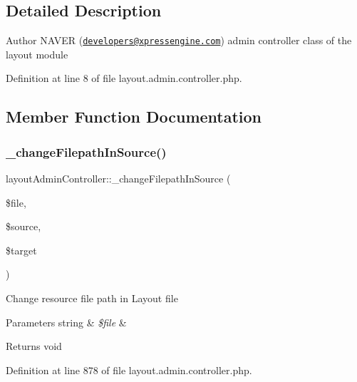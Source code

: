 \subsection{Detailed Description}
\begin{DoxyAuthor}{Author}
N\+A\+V\+ER (\href{mailto:developers@xpressengine.com}{\tt developers@xpressengine.\+com}) admin controller class of the layout module 
\end{DoxyAuthor}


Definition at line 8 of file layout.\+admin.\+controller.\+php.



\subsection{Member Function Documentation}
\hypertarget{classlayoutAdminController_a9dd8cb93d56db698fd6426a11dad6056}{}\label{classlayoutAdminController_a9dd8cb93d56db698fd6426a11dad6056} 
\subsubsection{\texorpdfstring{\+\_\+change\+Filepath\+In\+Source()}{\_changeFilepathInSource()}}
{\footnotesize\ttfamily layout\+Admin\+Controller\+::\+\_\+change\+Filepath\+In\+Source (\begin{DoxyParamCaption}\item[{}]{\$file,  }\item[{}]{\$source,  }\item[{}]{\$target }\end{DoxyParamCaption})}

Change resource file path in Layout file 
\begin{DoxyParams}[1]{Parameters}
string & {\em \$file} & \\
\hline
\end{DoxyParams}
\begin{DoxyReturn}{Returns}
void 
\end{DoxyReturn}


Definition at line 878 of file layout.\+admin.\+controller.\+php.

\hypertarget{classlayoutAdminController_a0663f5b179989279c5c73a3badd12c1c}{}\label{classlayoutAdminController_a0663f5b179989279c5c73a3badd12c1c} 
